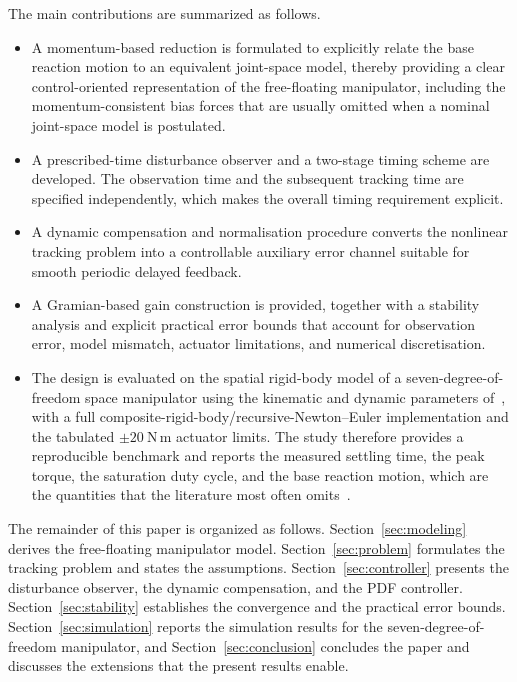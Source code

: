 The main contributions are summarized as follows.
\begin{itemize}
    \item A momentum-based reduction is formulated to explicitly relate the base reaction motion to an equivalent joint-space model, thereby providing a clear control-oriented representation of the free-floating manipulator, including the momentum-consistent bias forces that are usually omitted when a nominal joint-space model is postulated.
    \item A prescribed-time disturbance observer and a two-stage timing scheme are developed. The observation time and the subsequent tracking time are specified independently, which makes the overall timing requirement explicit.
    \item A dynamic compensation and normalisation procedure converts the nonlinear tracking problem into a controllable auxiliary error channel suitable for smooth periodic delayed feedback.
    \item A Gramian-based gain construction is provided, together with a stability analysis and explicit practical error bounds that account for observation error, model mismatch, actuator limitations, and numerical discretisation.
    \item The design is evaluated on the spatial rigid-body model of a seven-degree-of-freedom space manipulator using the kinematic and dynamic parameters of~\cite{dou2025fractional}, with a full composite-rigid-body/recursive-Newton--Euler implementation and the tabulated $\pm20~\mathrm{N\,m}$ actuator limits. The study therefore provides a reproducible benchmark and reports the measured settling time, the peak torque, the saturation duty cycle, and the base reaction motion, which are the quantities that the literature most often omits~\cite{yan}.
\end{itemize}

The remainder of this paper is organized as follows. Section~\ref{sec:modeling} derives the free-floating manipulator model. Section~\ref{sec:problem} formulates the tracking problem and states the assumptions. Section~\ref{sec:controller} presents the disturbance observer, the dynamic compensation, and the PDF controller. Section~\ref{sec:stability} establishes the convergence and the practical error bounds. Section~\ref{sec:simulation} reports the simulation results for the seven-degree-of-freedom manipulator, and Section~\ref{sec:conclusion} concludes the paper and discusses the extensions that the present results enable.
